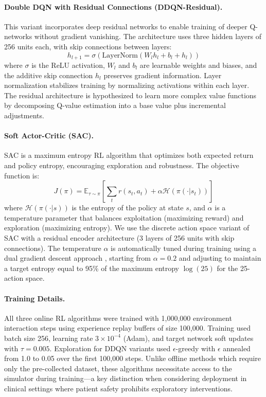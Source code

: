 \paragraph{Double DQN with Residual Connections (DDQN-Residual).}
This variant incorporates deep residual networks \citep{he2016deep} to enable training of deeper Q-networks without gradient vanishing. The architecture uses three hidden layers of 256 units each, with skip connections between layers:
\begin{equation}
h_{l+1} = \sigma(\text{LayerNorm}(W_l h_l + b_l + h_l))
\end{equation}
where $\sigma$ is the ReLU activation, $W_l$ and $b_l$ are learnable weights and biases, and the additive skip connection $h_l$ preserves gradient information. Layer normalization stabilizes training by normalizing activations within each layer. The residual architecture is hypothesized to learn more complex value functions by decomposing Q-value estimation into a base value plus incremental adjustments.

\paragraph{Soft Actor-Critic (SAC).}
SAC \citep{haarnoja2018soft} is a maximum entropy RL algorithm that optimizes both expected return and policy entropy, encouraging exploration and robustness. The objective function is:
\begin{equation}
J(\pi) = \mathbb{E}_{\tau \sim \pi}\left[\sum_t r(s_t, a_t) + \alpha \mathcal{H}(\pi(\cdot|s_t))\right]
\end{equation}
where $\mathcal{H}(\pi(\cdot|s))$ is the entropy of the policy at state $s$, and $\alpha$ is a temperature parameter that balances exploitation (maximizing reward) and exploration (maximizing entropy). We use the discrete action space variant of SAC with a residual encoder architecture (3 layers of 256 units with skip connections). The temperature $\alpha$ is automatically tuned during training using a dual gradient descent approach \citep{haarnoja2018soft_applications}, starting from $\alpha = 0.2$ and adjusting to maintain a target entropy equal to 95\% of the maximum entropy $\log(25)$ for the 25-action space.

\paragraph{Training Details.}
All three online RL algorithms were trained with 1,000,000 environment interaction steps using experience replay buffers of size 100,000. Training used batch size 256, learning rate $3 \times 10^{-4}$ (Adam), and target network soft updates with $\tau = 0.005$. Exploration for DDQN variants used $\epsilon$-greedy with $\epsilon$ annealed from 1.0 to 0.05 over the first 100,000 steps. Unlike offline methods which require only the pre-collected dataset, these algorithms necessitate access to the simulator during training—a key distinction when considering deployment in clinical settings where patient safety prohibits exploratory interventions.

